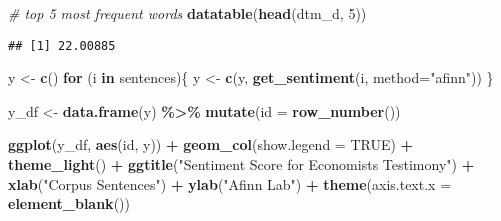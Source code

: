 \documentclass[]{article}
\newenvironment{Shaded}{\begin{snugshade}}{\end{snugshade}}
\newcommand{\CommentTok}[1]{\textcolor[rgb]{0.56,0.35,0.01}{\textit{#1}}}
\newcommand{\ControlFlowTok}[1]{\textcolor[rgb]{0.13,0.29,0.53}{\textbf{#1}}}
\newcommand{\DataTypeTok}[1]{\textcolor[rgb]{0.13,0.29,0.53}{#1}}
\newcommand{\DecValTok}[1]{\textcolor[rgb]{0.00,0.00,0.81}{#1}}
\newcommand{\KeywordTok}[1]{\textcolor[rgb]{0.13,0.29,0.53}{\textbf{#1}}}
\newcommand{\NormalTok}[1]{#1}
\newcommand{\OperatorTok}[1]{\textcolor[rgb]{0.81,0.36,0.00}{\textbf{#1}}}
\newcommand{\OtherTok}[1]{\textcolor[rgb]{0.56,0.35,0.01}{#1}}
\newcommand{\StringTok}[1]{\textcolor[rgb]{0.31,0.60,0.02}{#1}}
\begin{document}
\begin{Shaded}
\begin{Highlighting}[]
\CommentTok{\# top 5 most frequent words}
\KeywordTok{datatable}\NormalTok{(}\KeywordTok{head}\NormalTok{(dtm\_d, }\DecValTok{5}\NormalTok{))}
\end{Highlighting}
\end{Shaded}

\hypertarget{htmlwidget-99aeebb340fc1b994cb5}{}

\begin{Shaded}
\end{Shaded}

\begin{verbatim}
## [1] 22.00885
\end{verbatim}

\begin{Shaded}
\begin{Highlighting}[]
\NormalTok{y \textless{}{-}}\StringTok{ }\KeywordTok{c}\NormalTok{()}
\ControlFlowTok{for}\NormalTok{ (i }\ControlFlowTok{in}\NormalTok{ sentences)\{}
\NormalTok{  y \textless{}{-}}\StringTok{ }\KeywordTok{c}\NormalTok{(y, }\KeywordTok{get\_sentiment}\NormalTok{(i, }\DataTypeTok{method=}\StringTok{"afinn"}\NormalTok{))}
\NormalTok{\}}

\NormalTok{y\_df \textless{}{-}}\StringTok{ }\KeywordTok{data.frame}\NormalTok{(y) }\OperatorTok{\%\textgreater{}\%}\StringTok{ }
\StringTok{  }\KeywordTok{mutate}\NormalTok{(}\DataTypeTok{id =} \KeywordTok{row\_number}\NormalTok{())}

\KeywordTok{ggplot}\NormalTok{(y\_df, }\KeywordTok{aes}\NormalTok{(id, y)) }\OperatorTok{+}
\StringTok{  }\KeywordTok{geom\_col}\NormalTok{(}\DataTypeTok{show.legend =} \OtherTok{TRUE}\NormalTok{) }\OperatorTok{+}
\StringTok{  }\KeywordTok{theme\_light}\NormalTok{() }\OperatorTok{+}\StringTok{ }
\StringTok{  }\KeywordTok{ggtitle}\NormalTok{(}\StringTok{"Sentiment Score for Economist\textquotesingle{}s Testimony"}\NormalTok{) }\OperatorTok{+}\StringTok{  }
\StringTok{  }\KeywordTok{xlab}\NormalTok{(}\StringTok{"Corpus Sentences"}\NormalTok{) }\OperatorTok{+}\StringTok{ }
\StringTok{  }\KeywordTok{ylab}\NormalTok{(}\StringTok{"Afinn Lab"}\NormalTok{) }\OperatorTok{+}\StringTok{ }
\StringTok{  }\KeywordTok{theme}\NormalTok{(}\DataTypeTok{axis.text.x =} \KeywordTok{element\_blank}\NormalTok{()) }
\end{Highlighting}
\end{Shaded}
\end{document}
